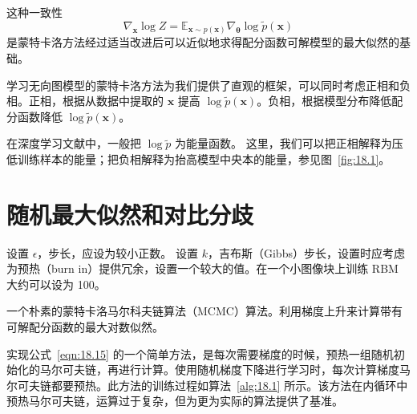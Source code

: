 这种一致性
\begin{equation}\label{eqn:18.15}
    \nabla_{\bm{x}}\log{}Z
    = \mathbb{E}_{\bm{x}\sim{}p(\bm{x})}
    \nabla_{\bm{\theta}}\log\widetilde{p}(\bm{x})
\end{equation}
是蒙特卡洛方法经过适当改进后可以近似地求得配分函数可解模型的最大似然的基础。

学习无向图模型的蒙特卡洛方法为我们提供了直观的框架，可以同时考虑正相和负相。正相，根据从数据中提取的 \(\bm x\) 提高 \(\log\widetilde{p}(\bm x)\)。负相，根据模型分布降低配分函数降低 \(\log\widetilde{p}(\bm x)\)。

在深度学习文献中，一般把 \(\log\widetilde{p}\) 为能量函数。
这里，我们可以把正相解释为压低训练样本的能量；把负相解释为抬高模型中央本的能量，参见图~\ref{fig:18.1}。

\section{随机最大似然和对比分歧}
\label{sec:18.2}

\begin{algorithm}
\DontPrintSemicolon
设置 \(\epsilon\)，步长，应设为较小正数。\;
设置 \(k\)，吉布斯（Gibbs）步长，设置时应考虑为预热（burn in）提供冗余，设置一个较大的值。在一个小图像块上训练 RBM 大约可以设为 100。\;
\caption{一个朴素的蒙特卡洛马尔科夫链算法（MCMC）算法。利用梯度上升来计算带有可解配分函数的最大对数似然。\label{alg:18.1}}
\end{algorithm}

实现公式~\ref{eqn:18.15} 的一个简单方法，是每次需要梯度的时候，预热一组随机初始化的马尔可夫链，再进行计算。使用随机梯度下降进行学习时，每次计算梯度马尔可夫链都要预热。此方法的训练过程如算法~\ref{alg:18.1} 所示。该方法在内循环中预热马尔可夫链，运算过于复杂，但为更为实际的算法提供了基准。

